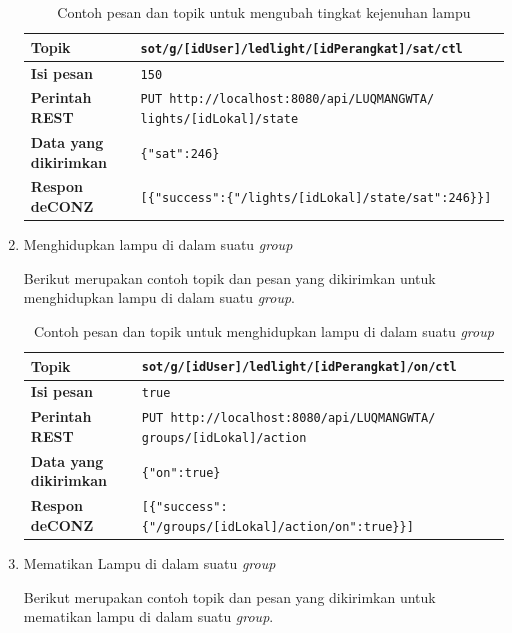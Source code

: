 \begin{enumerate}
	\begin{table}
		\centering
		\caption{Contoh pesan dan topik untuk mengubah tingkat kejenuhan lampu}
		\label{tab:satLampu}
		\begin{tabular}{| l | p{11cm} |}
			\hline
			\textbf{Topik} & \texttt{sot/g/[idUser]/ledlight/[idPerangkat]/sat/ctl} \\
			\hline
			\textbf{Isi pesan} & \texttt{150} \\
			\hline
			\textbf{Perintah REST} & \texttt{PUT http://localhost:8080/api/LUQMANGWTA/ lights/[idLokal]/state} \\
			\hline
			\textbf{Data yang dikirimkan} & \texttt{\{"sat":246\}} \\
			\hline
			\textbf{Respon deCONZ} & \texttt{[\{"success":\{"/lights/[idLokal]/state/sat":246\}\}]} \\
			\hline
		\end{tabular}
	\end{table}
	
	\item Menghidupkan lampu di dalam suatu \textit{group}
	
	Berikut merupakan contoh topik dan pesan yang dikirimkan untuk menghidupkan lampu di dalam suatu \textit{group}.
	
	\begin{table}
		\centering
		\caption{Contoh pesan dan topik untuk menghidupkan lampu di dalam suatu \textit{group}}
		\label{tab:nyalainLampuInGroup}
		\begin{tabular}{|l |p{11cm} |}
			\hline
			\textbf{Topik} & \texttt{sot/g/[idUser]/ledlight/[idPerangkat]/on/ctl} \\
			\hline
			\textbf{Isi pesan} & \texttt{true} \\
			\hline
			\textbf{Perintah REST }& \texttt{PUT http://localhost:8080/api/LUQMANGWTA/ groups/[idLokal]/action}\\
			\hline
			\textbf{Data yang dikirimkan} & \texttt{\{"on":true\}} \\
			\hline
			\textbf{Respon deCONZ} & \texttt{[\{"success":\{"/groups/[idLokal]/action/on":true\}\}]} \\
			\hline
		\end{tabular}
	\end{table}
	
	
	\item Mematikan Lampu di dalam suatu \textit{group}
	
	Berikut merupakan contoh topik dan pesan yang dikirimkan untuk mematikan lampu di dalam suatu \textit{group}.
	

\end{enumerate}
